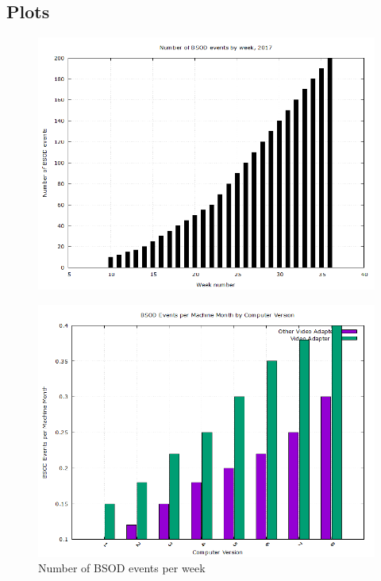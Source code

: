 \documentclass[paper=a4,fontsize=12pt,ngerman,parskip=half]{scrartcl}
\begin{document}
\pagebreak
\subsection*{Plots}
\begin{figure}[!ht]
  \centering
  \begin{minipage}[b]{0.4\textwidth}
    \centering
    \includegraphics[width=\textwidth]{graphics/Charts/New_Charts/plot1.png}
    \caption{Number of BSOD events per week}\cite{mosaic2017}
    \label{fig:Plot1}
  \end{minipage}
  \hfill
  \begin{minipage}[b]{0.4\textwidth}
    \centering
    \includegraphics[width=\textwidth]{graphics/Charts/New_Charts/plot2.png}

\end{minipage}
\end{figure}
\end{document}
